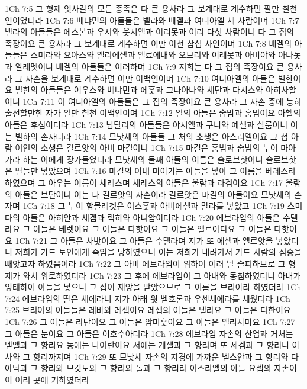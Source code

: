 1Ch 7:5  그 형제 잇사갈의 모든 종족은 다 큰 용사라 그 보계대로 계수하면 팔만 칠천인이었더라
1Ch 7:6  베냐민의 아들들은 벨라와 베겔과 여디아엘 세 사람이며
1Ch 7:7  벨라의 아들들은 에스본과 우시와 웃시엘과 여리못과 이리 다섯 사람이니 다 그 집의 족장이요 큰 용사라 그 보계대로 계수하면 이만 이천 삼십 사인이며
1Ch 7:8  베겔의 아들들은 스미라와 요아스와 엘리에셀과 엘료에내와 오므리와 여레못과 아비야와 아나돗과 알레멧이니 베겔의 아들들은 이러하며
1Ch 7:9  저희는 다 그 집의 족장이요 큰 용사라 그 자손을 보계대로 계수하면 이만 이백인이며
1Ch 7:10  여디아엘의 아들은 빌한이요 빌한의 아들들은 여우스와 베냐민과 에훗과 그나아나와 세단과 다시스와 아히사할이니
1Ch 7:11  이 여디아엘의 아들들은 그 집의 족장이요 큰 용사라 그 자손 중에 능히 출전할만한 자가 일만 칠천 이백인이며
1Ch 7:12  일의 아들은 숩빔과 훔빔이요 아헬의 아들은 후심이더라
1Ch 7:13  납달리의 아들들은 야시엘과 구니와 예셀과 살룸이니 이는 빌하의 손자더라
1Ch 7:14  므낫세의 아들들 그 처의 소생은 아스리엘이요 그 첩 아람 여인의 소생은 길르앗의 아비 마길이니
1Ch 7:15  마길은 훔빔과 숩빔의 누이 마아가라 하는 이에게 장가들었더라 므낫세의 둘째 아들의 이름은 슬로브핫이니 슬로브핫은 딸들만 낳았으며
1Ch 7:16  마길의 아내 마아가는 아들을 낳아 그 이름을 베레스라 하였으며 그 아우는 이름이 세레스며 세레스의 아들은 울람과 라겜이요
1Ch 7:17  울람의 아들은 브단이니 이는 다 길르앗의 자손이라 길르앗은 마길의 아들이요 므낫세의 손자며
1Ch 7:18  그 누이 함몰레겟은 이스훗과 아비에셀과 말라를 낳았고
1Ch 7:19  스미다의 아들은 아히안과 세겜과 릭히와 아니암이더라
1Ch 7:20  에브라임의 아들은 수델라요 그 아들은 베렛이요 그 아들은 다핫이요 그 아들은 엘르아다요 그 아들은 다핫이요
1Ch 7:21  그 아들은 사밧이요 그 아들은 수델라며 저가 또 에셀과 엘르앗을 낳았더니 저희가 가드 토인에게 죽임을 당하였으니 이는 저희가 내려가서 가드 사람의 짐승을 빼앗고자 하였음이라
1Ch 7:22  그 아비 에브라임이 위하여 여러 날 슬퍼하므로 그 형제가 와서 위로하였더라
1Ch 7:23  그 후에 에브라임이 그 아내와 동침하였더니 아내가 잉태하여 아들을 낳으니 그 집이 재앙을 받았으므로 그 이름을 브리아라 하였더라
1Ch 7:24  에브라임의 딸은 세에라니 저가 아래 윗 벧호론과 우센세에라를 세웠더라
1Ch 7:25  브리아의 아들들은 레바와 레셉이요 레셉의 아들은 델라요 그 아들은 다한이요
1Ch 7:26  그 아들은 라단이요 그 아들은 암미훗이요 그 아들은 엘리사마요
1Ch 7:27  그 아들은 눈이요 그 아들은 여호수아더라
1Ch 7:28  에브라임 자손의 산업과 거처는 벧엘과 그 향리요 동에는 나아란이요 서에는 게셀과 그 향리며 또 세겜과 그 향리니 아사와 그 향리까지며
1Ch 7:29  또 므낫세 자손의 지경에 가까운 벧스안과 그 향리와 다아낙과 그 향리와 므깃도와 그 향리와 돌과 그 향리라 이스라엘의 아들 요셉의 자손이 이 여러 곳에 거하였더라
